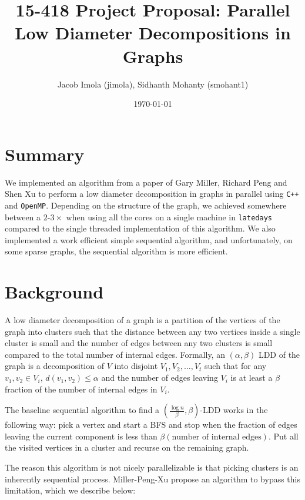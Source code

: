 \documentclass[11pt]{scrartcl}
\theoremstyle{plain}
\theoremstyle{definition}
\theoremstyle{remark}
\begin{document}
\title{15-418 Project Proposal: Parallel Low Diameter Decompositions in Graphs}
\author{\textsf{Jacob Imola (jimola), Sidhanth Mohanty (smohant1)}}
\date{\textsf{\today}}
\maketitle

\section{Summary}
We implemented an algorithm from a paper of Gary Miller, Richard Peng and Shen Xu \cite{miller2013parallel}
to perform a low diameter decomposition in graphs in parallel using \texttt{C++} and \texttt{OpenMP}.
Depending on the structure of the graph, we achieved somewhere between a $2$-$3\times$ when using all
the cores on a single machine in \texttt{latedays} compared to the single threaded implementation of
this algorithm. We also implemented a work efficient simple sequential algorithm, and unfortunately,
on some sparse graphs, the sequential algorithm is more efficient.

\section{Background}
A low diameter decomposition of a graph is a partition of the vertices of the graph into clusters such
that the distance between any two vertices inside a single cluster is small and the number of edges
between any two clusters is small compared to the total number of internal edges. Formally, an $(\alpha,
\beta)$ LDD of the graph is a decomposition of $V$ into disjoint $V_1,V_2,\ldots,V_t$ such that for
any $v_1,v_2\in V_i$, $d(v_1,v_2)\leq\alpha$ and the number of edges leaving $V_i$ is at least a
$\beta$ fraction of the number of internal edges in $V_i$.

The baseline sequential algorithm to find a $(\frac{\log n}{\beta},\beta)$-LDD works in the following way:
pick a vertex and start a BFS and stop when the fraction of edges leaving the current component is less
than $\beta(\text{number of internal edges})$. Put all the visited vertices in a cluster and recurse on the
remaining graph.

The reason this algorithm is not nicely parallelizable is that picking clusters is an inherently sequential process.
Miller-Peng-Xu \cite{miller2013parallel} propose an algorithm to bypass this limitation, which we describe below:
\end{document}

